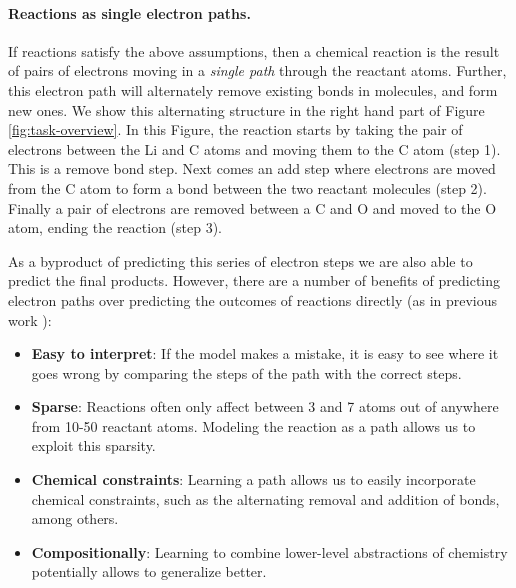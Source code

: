 \paragraph{Reactions as single electron paths.}
If reactions satisfy the above assumptions, then a chemical reaction is the result of pairs of electrons moving in a \emph{single path} through the reactant atoms. 
Further, this electron path will alternately remove existing bonds in molecules, and form new ones. We show this alternating structure in the right hand part of Figure \ref{fig:task-overview}.
In this Figure, the reaction starts by taking the pair of electrons between the Li and C atoms and moving them to the C atom (step 1). This is a remove bond step. 
Next comes an add step where electrons are moved from the C atom to form a bond between the two reactant molecules (step 2).
Finally a pair of electrons are removed between a C and O and moved to the O atom, ending the reaction (step 3).

As a byproduct of predicting this series of electron steps we are also able to predict the final products.
However, there are a number of benefits of predicting electron paths over predicting the outcomes of reactions directly (as in previous work \cite{jin2017predicting,schwaller2017found}):
\begin{itemize}
\item \textbf{Easy to interpret}: If the model makes a mistake, it is easy to see where it goes wrong by comparing the steps of the path with the correct steps.
\item \textbf{Sparse}: Reactions often only affect between 3 and 7 atoms out of anywhere from 10-50 reactant atoms. Modeling the reaction as a path allows us to exploit this sparsity.
\item \textbf{Chemical constraints}: Learning a path allows us to easily incorporate chemical constraints, such as the alternating removal and addition of bonds, among others.
\item \textbf{Compositionally}: Learning to combine lower-level abstractions of chemistry potentially allows to generalize better.
\end{itemize}

